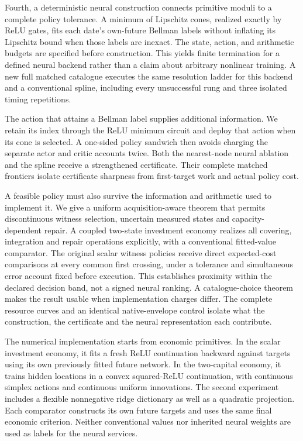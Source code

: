 \documentclass[ecta,nameyear,draft]{econsocart}
\begin{document}
Fourth, a deterministic neural construction connects primitive moduli to a complete policy tolerance. A minimum of Lipschitz cones, realized exactly by ReLU gates, fits each date's own-future Bellman labels without inflating its Lipschitz bound when those labels are inexact. The state, action, and arithmetic budgets are specified before construction. This yields finite termination for a defined neural backend rather than a claim about arbitrary nonlinear training. A new full matched catalogue executes the same resolution ladder for this backend and a conventional spline, including every unsuccessful rung and three isolated timing repetitions.

The action that attains a Bellman label supplies additional information. We retain its index through the ReLU minimum circuit and deploy that action when its cone is selected. A one-sided policy sandwich then avoids charging the separate actor and critic accounts twice. Both the nearest-node neural ablation and the spline receive a strengthened certificate. Their complete matched frontiers isolate certificate sharpness from first-target work and actual policy cost.

A feasible policy must also survive the information and arithmetic used to implement it. We give a uniform acquisition-aware theorem that permits discontinuous witness selection, uncertain measured states and capacity-dependent repair. A coupled two-state investment economy realizes all covering, integration and repair operations explicitly, with a conventional fitted-value comparator. The original scalar witness policies receive direct expected-cost comparisons at every common first crossing, under a tolerance and simultaneous error account fixed before execution. This establishes proximity within the declared decision band, not a signed neural ranking. A catalogue-choice theorem makes the result usable when implementation charges differ. The complete resource curves and an identical native-envelope control isolate what the construction, the certificate and the neural representation each contribute.

The numerical implementation starts from economic primitives. In the scalar investment economy, it fits a fresh ReLU continuation backward against targets using its own previously fitted future network. In the two-capital economy, it trains hidden locations in a convex squared-ReLU continuation, with continuous simplex actions and continuous uniform innovations. The second experiment includes a flexible nonnegative ridge dictionary as well as a quadratic projection. Each comparator constructs its own future targets and uses the same final economic criterion. Neither conventional values nor inherited neural weights are used as labels for the neural services.
\end{document}
